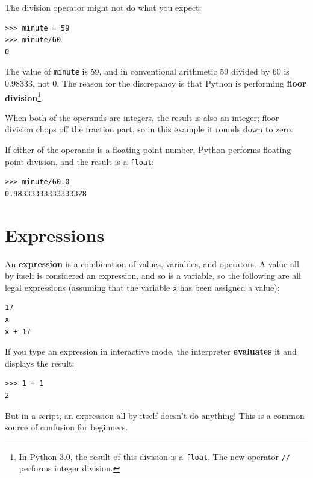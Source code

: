 \documentclass[10pt]{book}
\begin{document}

The division operator might not do what you expect:

\beforeverb
\begin{verbatim}
>>> minute = 59
>>> minute/60
0
\end{verbatim}
\afterverb
%
The value of {\tt minute} is 59, and in conventional arithmetic 59
divided by 60 is 0.98333, not 0.  The reason for the discrepancy is
that Python is performing {\bf floor division}\footnote{In Python 3.0,
the result of this division is a {\tt float}.  The new operator
{\tt //} performs integer division.}.


When both of the operands are integers, the result is also an
integer; floor division chops off the fraction
part, so in this example it rounds down to zero.

If either of the operands is a floating-point number, Python performs
floating-point division, and the result is a {\tt float}:

\beforeverb
\begin{verbatim}
>>> minute/60.0
0.98333333333333328
\end{verbatim}
\afterverb


\section{Expressions}

An {\bf expression} is a combination of values, variables, and operators.
A value all by itself is considered an expression, and so is
a variable, so the following are all legal expressions
(assuming that the variable {\tt x} has been assigned a value):


\beforeverb
\begin{verbatim}
17
x
x + 17
\end{verbatim}
\afterverb
%
If you type an expression in interactive mode, the interpreter
{\bf evaluates} it and displays the result:

\beforeverb
\begin{verbatim}
>>> 1 + 1
2
\end{verbatim}
\afterverb
%
But in a script, an expression all by itself doesn't
do anything!  This is a common
source of confusion for beginners.
\end{document}
